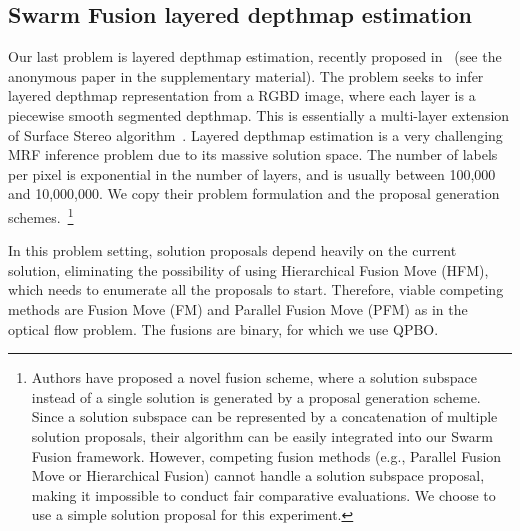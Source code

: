 \subsection{Swarm Fusion layered depthmap estimation}
Our last problem is layered depthmap estimation, recently proposed
in~\cite{layered_depthmap} (see the anonymous paper in the
supplementary material).  The problem seeks to infer layered depthmap
representation from a RGBD image, where each layer is a piecewise
smooth segmented depthmap. This is essentially a multi-layer extension
of Surface Stereo algorithm~\cite{surface_stereo}.
%
Layered depthmap estimation is a very challenging MRF inference problem
due to its massive solution space. The number of labels per pixel is
exponential in the number of layers, and is usually between 100,000 and
10,000,000. We copy their problem formulation and the proposal
generation schemes.~\footnote{Authors have proposed a novel fusion
scheme, where a solution subspace instead of a single solution is
generated by a proposal generation scheme. Since a solution subspace can
be represented by a concatenation of multiple solution proposals,
their algorithm can be easily integrated into our Swarm Fusion framework.
However, competing fusion methods (e.g., Parallel Fusion Move or
Hierarchical Fusion) cannot handle a solution subspace proposal, making
it impossible to conduct fair comparative evaluations. We choose to use
a simple solution proposal for this experiment.}


\noindent In this problem setting, solution proposals depend heavily on the current solution,
eliminating the possibility of using Hierarchical Fusion Move (HFM), which needs to
enumerate all the proposals to start. Therefore, viable competing
methods are Fusion Move (FM) and Parallel Fusion Move (PFM) as in the optical flow problem.
%
%
The fusions are binary, for which we use QPBO.

